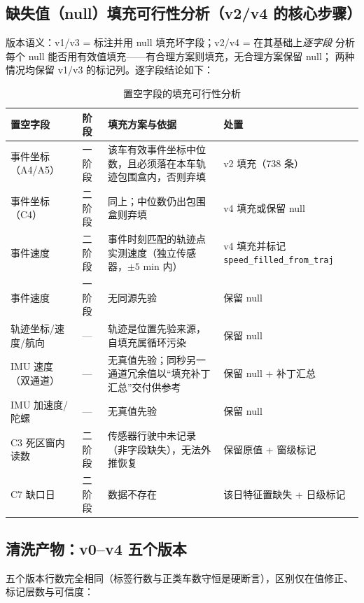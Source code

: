 \subsection{缺失值（null）填充可行性分析（v2/v4 的核心步骤）}

版本语义：v1/v3 = 标注并用 null 填充坏字段；v2/v4 = 在其基础上\emph{逐字段}
分析每个 null 能否用有效值填充——有合理方案则填充，无合理方案保留 null；
两种情况均保留 v1/v3 的标记列。逐字段结论如下：

\begin{table}[H]
\centering
\caption{置空字段的填充可行性分析}
\label{tab:fill}
\small
\begin{tabularx}{\textwidth}{llLL}
\toprule
置空字段 & 阶段 & 填充方案与依据 & 处置 \\
\midrule
事件坐标（A4/A5） & 一阶段 & 该车有效事件坐标中位数，且必须落在本车轨迹包围盒内，否则弃填 & v2 填充（738 条） \\
事件坐标（C4） & 二阶段 & 同上；中位数仍出包围盒则弃填 & v4 填充或保留 null \\
事件速度 & 二阶段 & 事件时刻匹配的轨迹点实测速度（独立传感器，$\pm5$ min 内） & v4 填充并标记 \texttt{speed\_filled\_from\_traj} \\
事件速度 & 一阶段 & 无同源先验 & 保留 null \\
轨迹坐标/速度/航向 & --- & 轨迹是位置先验来源，自填充属循环污染 & 保留 null \\
IMU 速度（双通道） & --- & 无真值先验；同秒另一通道冗余值以“填充补丁汇总”交付供参考 & 保留 null + 补丁汇总 \\
IMU 加速度/陀螺 & --- & 无真值先验 & 保留 null \\
C3 死区窗内读数 & 二阶段 & 传感器行驶中未记录（非字段缺失），无法外推恢复 & 保留原值 + 窗级标记 \\
C7 缺口日 & 二阶段 & 数据不存在 & 该日特征置缺失 + 日级标记 \\
\bottomrule
\end{tabularx}
\end{table}

\subsection{清洗产物：v0--v4 五个版本}

五个版本行数完全相同（标签行数与正类车数守恒是硬断言），区别仅在值修正、
标记层数与可信度：

